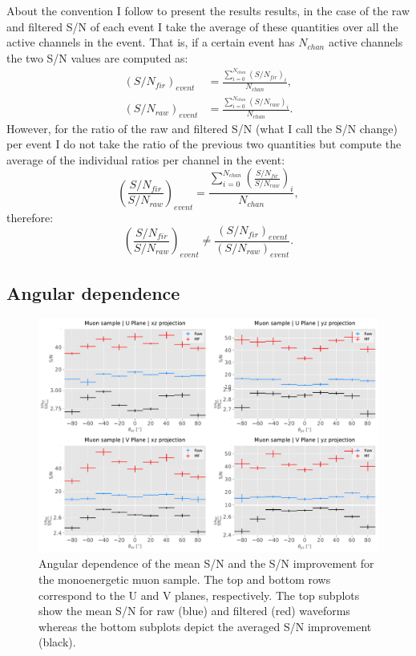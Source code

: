 About the convention I follow to present the results results, in the case of the raw and filtered S/N of each event I take the average of these quantities over all the active channels in the event. That is, if a certain event has $N_{chan}$ active channels the two S/N values are computed as:
\begin{equation}
\begin{split}
\left(S/N_{fir}\right)_{event} &= \frac{\sum_{i=0}^{N_{chan}} \left(S/N_{fir}\right)_{i}}{N_{chan}},\\
\left(S/N_{raw}\right)_{event} &= \frac{\sum_{i=0}^{N_{chan}} \left(S/N_{raw}\right)_{i}}{N_{chan}}.
\end{split}
\end{equation}
However, for the ratio of the raw and filtered S/N (what I call the S/N change) per event I do not take the ratio of the previous two quantities but compute the average of the individual ratios per channel in the event:
\begin{equation}
\left(\frac{S/N_{fir}}{S/N_{raw}}\right)_{event} = \frac{\sum_{i=0}^{N_{chan}} \left(\frac{S/N_{fir}}{S/N_{raw}}\right)_{i}}{N_{chan}},
\end{equation}
therefore:
\begin{equation}
\left(\frac{S/N_{fir}}{S/N_{raw}}\right)_{event}  \neq \frac{\left(S/N_{fir}\right)_{event}}{\left(S/N_{raw}\right)_{event}}.
\end{equation}

\subsection{Angular dependence}
\label{subsec:2.5.1}

\begin{figure}[t]
	\centering
	\includegraphics[width=0.9\linewidth]{Images/Matched_Filter/larsoft_muon_angular_alt.pdf}
	\caption[Angular dependence of the mean S/N and the S/N improvement for the monoenergetic muon sample.]{Angular dependence of the mean S/N and the S/N improvement for the monoenergetic muon sample. The top and bottom rows correspond to the U and V planes, respectively. The top subplots show the mean S/N for raw (blue) and filtered (red) waveforms whereas the bottom subplots depict the averaged S/N improvement (black).}
	\label{fig:angular_muon}
\end{figure}

